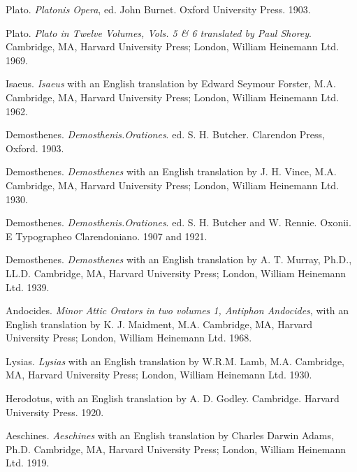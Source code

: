 \documentclass[a4paper,twocolumn,twoside,notitlepage,10pt]{article}
\begin{document}
\begin{description} %
    \item Plato. \emph{Platonis Opera}, ed. John Burnet. Oxford University Press. 1903.
    \item Plato. \emph{Plato in Twelve Volumes, Vols. 5 \& 6 translated by Paul Shorey}. Cambridge, MA, Harvard University Press; London, William Heinemann Ltd. 1969.

    \item Isaeus. \emph{Isaeus} with an English translation by Edward Seymour Forster, M.A. Cambridge, MA, Harvard University Press; London, William Heinemann Ltd. 1962.

    \item Demosthenes. \emph{Demosthenis.Orationes}. ed. S. H. Butcher. Clarendon Press, Oxford. 1903.
    \item Demosthenes. \emph{Demosthenes} with an English translation by J. H. Vince, M.A. Cambridge, MA, Harvard University Press; London, William Heinemann Ltd. 1930.

    \item Demosthenes. \emph{Demosthenis.Orationes}. ed. S. H. Butcher and W. Rennie. Oxonii. E Typographeo Clarendoniano. 1907 and 1921.
    \item Demosthenes. \emph{Demosthenes} with an English translation by A. T. Murray, Ph.D., LL.D. Cambridge, MA, Harvard University Press; London, William Heinemann Ltd. 1939.

    \item Andocides. \emph{Minor Attic Orators in two volumes 1, Antiphon Andocides}, with an English translation by K. J. Maidment, M.A. Cambridge, MA, Harvard University Press; London, William Heinemann Ltd. 1968.
    \item Lysias. \emph{Lysias} with an English translation by W.R.M. Lamb, M.A. Cambridge, MA, Harvard University Press; London, William Heinemann Ltd. 1930.
\end{description}

\begin{description} %
	\item Herodotus, with an English translation by A. D. Godley. Cambridge. Harvard University Press. 1920.
	\item Aeschines. \emph{Aeschines} with an English translation by Charles Darwin Adams, Ph.D. Cambridge, MA, Harvard University Press; London, William Heinemann Ltd. 1919.
\end{description}
\end{document}
